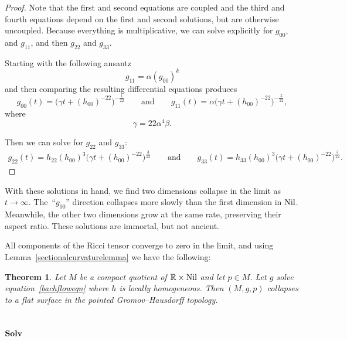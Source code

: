 \documentclass[10pt,a4paper]{amsart}
\numberwithin{equation}{section}
\newtheorem{Theorem}{Theorem}[section]
\begin{document}
\begin{proof}
Note that the first and second equations are coupled and the third and fourth equations depend on the first and second solutions, but are otherwise uncoupled. Because everything is multiplicative, we can solve explicitly for $g_{00}$, and $g_{11}$, and then $g_{22}$ and $g_{33}$.

Starting with the following ansantz
\begin{equation*} %
g_{11} = \alpha (g_{00})^k
\end{equation*}
and then comparing the resulting differential equations produces
\[
g_{00}(t) = \big(\gamma t + (h_{00})^{-22}\big)^{-\frac{1}{22}}
\qquad \text{and}\qquad g_{11}(t) = \alpha \big(\gamma t + (h_{00})^{-22} \big)^{-\frac{5}{22}},
\]
where
\[
\gamma = 22 \alpha^4 \beta.
\]

Then we can solve for $g_{22}$ and $g_{33}$:
\begin{gather*}
g_{22}(t) = h_{22} (h_{00})^{3}
		\big(\gamma t + (h_{00})^{-22} \big)^{\frac{3}{22}}
\qquad \text{and}\qquad
g_{33}(t) = h_{33} (h_{00})^{3}
		\big(\gamma t + (h_{00})^{-22}\big)^{\frac{3}{22}}.\tag*{\qed}
\end{gather*}\renewcommand{\qed}{}
\end{proof}

With these solutions in hand, we find two dimensions collapse in the limit as $t \rightarrow \infty$. The~``$g_{00}$'' direction collapses more slowly than the first dimension in ${\rm Nil}$. Meanwhile, the other two dimensions grow at the same rate, preserving their aspect ratio. These solutions are immortal, but not ancient.

All components of the Ricci tensor converge to zero in the limit, and using Lemma~\ref{sectionalcurvaturelemma} we have the following:

\begin{Theorem}Let $M$ be a compact quotient of $\mathbb{R} \times {\rm Nil}$ and let $p \in M$. Let $g$ solve equation~\eqref{bachfloweqn} where $h$ is locally homogeneous. Then $(M, g, p)$ collapses to a flat surface in the pointed Gromov--Hausdorff topology.
\end{Theorem}

\subsection[${\rm Solv}$]{$\boldsymbol{{\rm Solv}}$} \label{solvsection}
\end{document}
